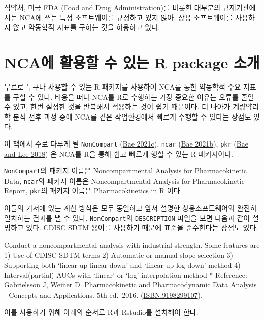 \documentclass[
  11pt,
  krantz2, a4paper, twoside]{krantz}
\renewenvironment{quote}{\begin{VF}}{\end{VF}}
\theoremstyle{definition}
\theoremstyle{definition}
\theoremstyle{definition}
\theoremstyle{definition}
\theoremstyle{remark}
\begin{document}
식약처, 미국 FDA (Food and Drug Administration)를 비롯한 대부분의 규제기관에서는 NCA에 쓰는 특정 소프트웨어를 규정하고 있지 않아, 상용 소프트웨어를 사용하지 않고 약동학적 지표를 구하는 것을 허용하고 있다.

\hypertarget{ncauxc5d0-uxd65cuxc6a9uxd560-uxc218-uxc788uxb294-r-package-uxc18cuxac1c}{%
\section{NCA에 활용할 수 있는 R package 소개}\label{ncauxc5d0-uxd65cuxc6a9uxd560-uxc218-uxc788uxb294-r-package-uxc18cuxac1c}}

무료로 누구나 사용할 수 있는 R 패키지를 사용하여 NCA를 통한 약동학적 주요 지표를 구할 수 있다. 비용을 떠나 NCA를 R로 수행하는 가장 중요한 이유는 오류를 줄일 수 있고, 한번 설정한 것을 반복해서 적용하는 것이 쉽기 때문이다. 더 나아가 계량약리학 분석 전후 과정 중에 NCA를 같은 작업환경에서 빠르게 수행할 수 있다는 장점도 있다.

이 책에서 주로 다루게 될 \texttt{NonCompart} (\protect\hyperlink{ref-R-NonCompart}{Bae 2021c}), \texttt{ncar} (\protect\hyperlink{ref-R-ncar}{Bae 2021b}), \texttt{pkr} (\protect\hyperlink{ref-R-pkr}{Bae and Lee 2018}) 은 NCA를 R을 통해 쉽고 빠르게 행할 수 있는 R 패키지이다.

\texttt{NonCompart}의 패키지 이름은 Noncompartmental Analysis for Pharmacokinetic Data,
\texttt{ncar}의 패키지 이름은 Noncompartmental Analysis for Pharmacokinetic Report,
\texttt{pkr}의 패키지 이름은 Pharmacokinetics in R 이다.

이들의 기저에 있는 계산 방식은 모두 동일하고 앞서 설명한 상용소프트웨어와 완전히 일치하는 결과를 낼 수 있다. \texttt{NonCompart}의 \texttt{DESCRIPTION} 파일을 보면 다음과 같이 설명하고 있다. CDISC SDTM 용어를 사용하기 때문에 표준을 준수한다는 장점도 있다.

\begin{quote}
Conduct a noncompartmental analysis with industrial strength.
Some features are
1) Use of CDISC SDTM terms
2) Automatic or manual slope selection
3) Supporting both `linear-up linear-down' and `linear-up log-down' method
4) Interval(partial) AUCs with `linear' or `log' interpolation method
* Reference: Gabrielsson J, Weiner D. Pharmacokinetic and Pharmacodynamic Data Analysis - Concepts and Applications. 5th ed.~2016. (\url{ISBN:9198299107}).
\end{quote}

이를 사용하기 위해 아래의 순서로 R과 Rstudio를 설치해야 한다.
\end{document}
